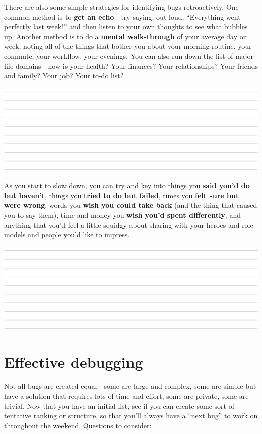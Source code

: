 There are also some simple strategies for identifying bugs retroactively.  One common method is to \textbf{get an echo}---try saying, out loud, ``Everything went perfectly last week!'' and then listen to your own thoughts to see what bubbles up.  Another method is to do a \textbf{mental walk-through} of your average day or week, noting all of the things that bother you about your morning routine, your commute, your workflow, your evenings.  You can also run down the list of major life domains---how is your health?  Your finances?  Your relationships?  Your friends and family?  Your job?  Your to-do list?  

\setlength{\parindent}{0em}
\includegraphics[width=\textwidth]{../../../img/linesquarter.png}
\setlength{\parindent}{1.5em}

As you start to slow down, you can try and key into things you \textbf{said you'd do but haven't}, things you \textbf{tried to do but failed}, times you \textbf{felt sure but were wrong}, words you \textbf{wish you could take back} (and the thing that caused you to say them), time and money you \textbf{wish you'd spent differently}, and anything that you'd feel a little squidgy about sharing with your heroes and role models and people you'd like to impress.

\setlength{\parindent}{0em}
\includegraphics[width=\textwidth]{../../../img/linesquarter.png}
\setlength{\parindent}{1.5em}

\section*{Effective debugging}
Not all bugs are created equal---some are large and complex, some are simple but have a solution that requires lots of time and effort, some are private, some are trivial.  Now that you have an initial list, see if you can create some sort of tentative ranking or structure, so that you'll always have a ``next bug'' to work on throughout the weekend.  Questions to consider:

